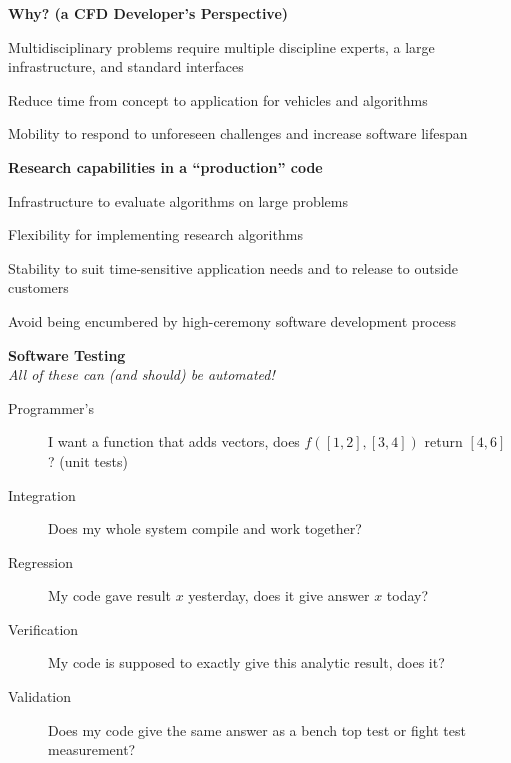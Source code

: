\documentclass[landscape]{slides}
\renewcommand{\title}[1]{{\large\bfseries #1}}
\newenvironment{itemiz}%
  {\begin{list}{}{\raggedright
      \setlength{\itemsep}{2pt}%
      \setlength{\parskip}{4pt}\setlength{\parsep}{2pt}}}%
  {\end{list}}%
\begin{document}
 \begin{slide}
  \title{Why? (a CFD Developer's Perspective)}
  \begin{itemiz}
   \item Multidisciplinary problems require multiple discipline
   experts, a large infrastructure, and standard interfaces
   \vspace{6pt}
   \item Reduce time from concept to application for vehicles and algorithms
   \vspace{6pt}
   \item Mobility to respond to unforeseen challenges and increase
   software lifespan
  \end{itemiz}

  \title{Research capabilities in a ``production'' code}
  \begin{itemiz}
    \item Infrastructure to evaluate algorithms on large problems
    \item Flexibility for implementing research algorithms 
    \item Stability to suit time-sensitive application needs and to
    release to outside customers
    \item Avoid being encumbered by high-ceremony software development process
  \end{itemiz}
 \end{slide}
 
 \begin{slide}
   \title{Software Testing} \\
   \emph{All of these can (and should) be automated!}
   \begin{description}
   \item[Programmer's] I want a function that adds vectors, does 
   $f([1, 2], [3, 4])$ return $[4, 6]$? (unit tests)
   \item[Integration] Does my whole system compile and work together?
   \item[Regression] My code gave result $x$ yesterday, does it give
   answer $x$ today?
   \item[Verification] My code is supposed to exactly give this analytic result,
     does it?
   \item[Validation] Does my code give the same answer as a bench top test or fight test measurement?
   \end{description}
 \end{slide}
 
\end{document}
